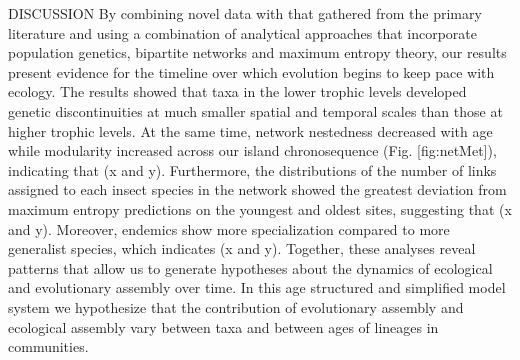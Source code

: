 \documentclass[12pt]{article}
\begin{document}
\begin{linenumbers}
DISCUSSION
By combining novel data with that gathered from the primary literature and using a combination of analytical approaches that incorporate population genetics, bipartite networks and maximum entropy theory, our results present evidence for the timeline over which evolution begins to keep pace with ecology. The results showed that taxa in the lower trophic levels developed genetic discontinuities at much smaller spatial and temporal scales than those at higher trophic levels. At the same time, network nestedness decreased with age while modularity increased across our island chronosequence (Fig. [fig:netMet]), indicating that (x and y). Furthermore, the distributions of the number of links assigned to each insect species in the network showed the greatest deviation from maximum entropy predictions on the youngest and oldest sites, suggesting that (x and y). Moreover, endemics show more specialization compared to more generalist species, which indicates (x and y). Together, these analyses reveal patterns that allow us to generate hypotheses about the dynamics of ecological and evolutionary assembly over time. In this age structured and simplified model system we hypothesize that the contribution of evolutionary assembly and ecological assembly vary between taxa and between ages of lineages in communities. 


\end{linenumbers}
\end{document}
